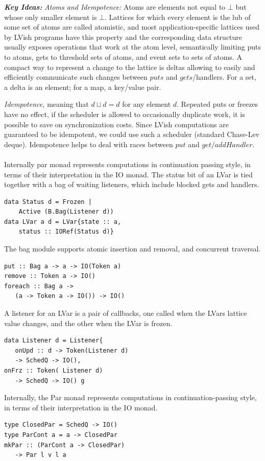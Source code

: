 \documentclass[twocolumn]{article}
\begin{document}
\textbf{\textit{Key Ideas:}} \textit{Atoms and Idempotence:} Atoms are elements not equal to $\bot$ but whose only smaller
element is $\bot$. Lattices for which every element is the lub of some set of atoms are called atomistic, and most application-specific lattices used by LVish programs have this property and the corresponding data structure usually exposes operations that
work at the atom level, semantically limiting puts to atoms, gets to threshold sets of atoms, and event sets to sets of atoms. A compact way to represent a change to the lattice is deltas allowing to easily and efficiently communicate such changes between
$puts$ and $gets$/handlers. For a set, a delta is an element; for a map, a key/value pair.\par
\textit{Idempotence,} meaning that $d\sqcup{d=d}$ for any element $d$. Repeated puts or freezes have no effect, if the scheduler is allowed to occasionally duplicate work, it is possible to save on synchronization costs. Since LVish computations are guaranteed to be idempotent, we could use such a scheduler (standard Chase-Lev deque\cite{sched}). Idempotence helps to deal with races between $put$ and $get/addHandler$. \\ \\
Internally par monad represents computations in continuation passing style, in terms of their interpretation in the IO monad. The status bit of an LVar is tied together with a bag of waiting listeners, which include blocked gets and handlers.
\begin{verbatim}
data Status d = Frozen |
	Active (B.Bag(Listener d))
data LVar a d = LVar{state :: a,
	status :: IORef(Status d)} 
\end{verbatim}
The bag module supports atomic insertion and removal, and concurrent traversal.
\begin{verbatim}
put :: Bag a -> a -> IO(Token a)
remove :: Token a -> IO()
foreach :: Bag a ->
   (a -> Token a -> IO()) -> IO()
\end{verbatim}
A listener for an LVar is a pair of callbacks, one called when the LVars lattice value changes, and the other when the LVar is frozen. 
\begin{verbatim}
data Listener d = Listener{
   onUpd :: d -> Token(Listener d)
   -> SchedQ -> IO(),
onFrz :: Token( Listener d)
   -> SchedQ -> IO() g
\end{verbatim}
Internally, the Par monad represents computations in continuation-passing style, in terms of their interpretation in the IO monad.
\begin{verbatim}
type ClosedPar = SchedQ -> IO()
type ParCont a = a -> ClosedPar
mkPar :: (ParCont a -> ClosedPar)
   -> Par l v l a
\end{verbatim}
\end{document}

